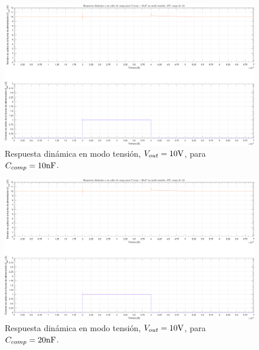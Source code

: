 \clearpage

\begin{figure}[H] %
\begin{center}
\includegraphics[width=1.1 \textwidth, angle=90]{./img/plots/dynamic/power_supply_CCOMP_10n_STEP_Modo1.png}
\caption{\label{fig:fig_power_supply_CCOMP_STEP_10n_Modo1}\footnotesize{Respuesta dinámica en modo tensión, $V_{out} = 10 \si[per-mode=symbol]{\volt}$, para $C_{comp} = 10 \si[per-mode=symbol]{\nano\farad} $.}}
\end{center}
\end{figure}

\clearpage

\begin{figure}[H] %
\begin{center}
\includegraphics[width=1.1 \textwidth, angle=90]{./img/plots/dynamic/power_supply_CCOMP_20n_STEP_Modo1.png}
\caption{\label{fig:fig_power_supply_CCOMP_STEP_20n_Modo1}\footnotesize{Respuesta dinámica en modo tensión, $V_{out} = 10 \si[per-mode=symbol]{\volt}$, para $C_{comp} = 20 \si[per-mode=symbol]{\nano\farad} $.}}
\end{center}
\end{figure}

